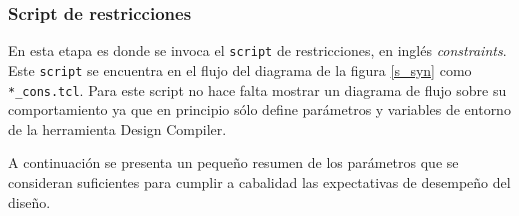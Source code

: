 \subsubsection{Script de restricciones}

En esta etapa es donde se invoca el \texttt{script} de restricciones, en inglés \textit{constraints}. Este \texttt{script} se encuentra en el flujo del diagrama de la figura \ref{s_syn} como \texttt{*\_cons.tcl}. Para este script no hace falta mostrar un diagrama de flujo sobre su comportamiento ya que en principio sólo define parámetros y variables de entorno de la herramienta Design Compiler.

A continuación se presenta un pequeño resumen de los parámetros que se consideran suficientes para cumplir a cabalidad las expectativas de desempeño del diseño.

